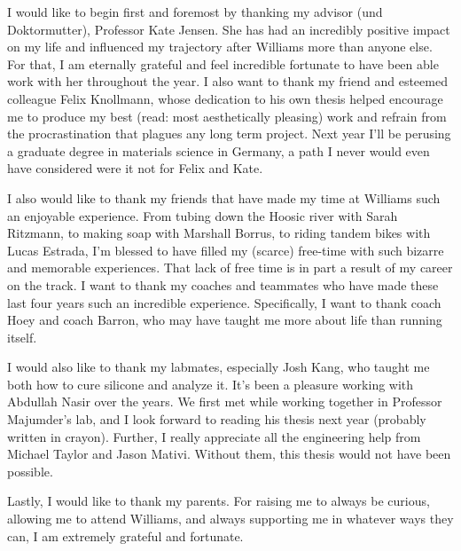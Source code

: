
I would like to begin first and foremost by thanking my advisor (und Doktormutter), Professor Kate Jensen. She has had an incredibly positive impact on my life and influenced my trajectory after Williams more than anyone else. For that, I am eternally grateful and feel incredible fortunate to have been able work with her throughout the year. I also want to thank my friend and esteemed colleague Felix Knollmann, whose dedication to his own thesis helped encourage me to produce my best (read: most aesthetically pleasing) work and refrain from the procrastination that plagues any long term project. Next year I'll be perusing a graduate degree in materials science in Germany, a path I never would even have considered were it not for Felix and Kate. 

I also would like to thank my friends that have made my time at Williams such an enjoyable experience. From tubing down the Hoosic river with Sarah Ritzmann, to making soap with Marshall Borrus, to riding tandem bikes with Lucas Estrada, I'm blessed to have filled my (scarce) free-time with such bizarre and memorable experiences. That lack of free time is in part a result of my career on the track. I want to thank my coaches and teammates who have made these last four years such an incredible experience. Specifically, I want to thank coach Hoey and coach Barron, who may have taught me more about life than running itself. 

I would also like to thank my labmates, especially Josh Kang, who taught me both how to cure silicone and analyze it. It's been a pleasure working with Abdullah Nasir over the years. We first met while working together in Professor Majumder's lab, and I look forward to reading his thesis next year (probably written in crayon). Further, I really appreciate all the engineering help from Michael Taylor and Jason Mativi. Without them, this thesis would not have been possible.

Lastly, I would like to thank my parents. For raising me to always be curious, allowing me to attend Williams, and always supporting me in whatever ways they can, I am extremely grateful and fortunate. 


